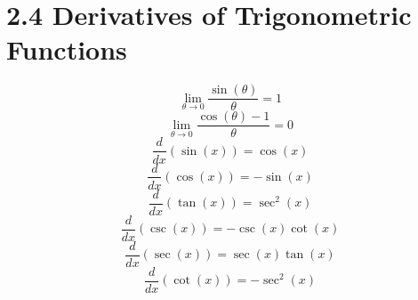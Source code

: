 %
%

\section*{2.4 Derivatives of Trigonometric Functions}

\[ \lim_{\theta \to 0} \frac{\sin(\theta)}{\theta}=1 \]
\[ \lim_{\theta \to 0} \frac{\cos(\theta)-1}{\theta}=0 \]
\[ \frac{d}{dx}(\sin(x))=\cos(x) \]
\[ \frac{d}{dx}(\cos(x))=-\sin(x) \]
\[ \frac{d}{dx}(\tan(x))=\sec^2(x) \]
\[ \frac{d}{dx}(\csc(x))=-\csc(x)\cot(x) \]
\[ \frac{d}{dx}(\sec(x))=\sec(x)\tan(x) \]
\[ \frac{d}{dx}(\cot(x))=-\sec^2(x) \]

